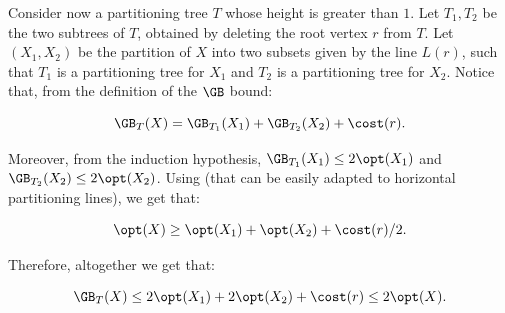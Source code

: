 Consider now a partitioning tree $T$ whose height is greater than $1$. Let $T_1,T_2$ be the two subtrees of $T$, obtained by deleting the root vertex $r$ from $T$. Let $(X_1,X_2)$ be the partition of $X$ into two subsets given by the line $L(r)$, such that $T_1$ is a partitioning tree for $X_1$ and $T_2$ is a partitioning tree for $X_2$. Notice that, from the definition of the $\GB$ bound:

\[\GB_T(X)=\GB_{T_1}(X_1)+\GB_{T_2}(X_2)+\cost(r).\]

Moreover, from the induction hypothesis, $\GB_{T_1}(X_1)\leq 2\opt(X_1)$ and $\GB_{T_2}(X_2)\leq 2\opt(X_2)$.
Using  (that can be easily adapted to horizontal partitioning lines), we get that:


\[\opt(X)\geq \opt(X_1)+\opt(X_2)+\cost(r)/2.\]

Therefore, altogether we get that:


\[\GB_T(X)\leq 2\opt(X_1)+2\opt(X_2)+\cost(r)\leq 2\opt(X).  \]

\nocite{conf-version}
